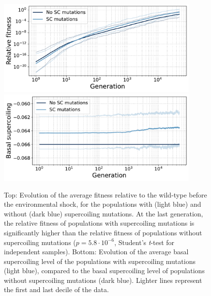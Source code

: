 \begin{figure}
\centering
\includegraphics[width=0.9\textwidth]{epistasis/img/relative_fitness_grouped.pdf}
\includegraphics[width=0.9\textwidth]{epistasis/img/with-sc/basal_sc_all.pdf}
\caption[Average fitness relative to the ancestor and basal supercoiling, during evolution after an environmental shock]{Top: Evolution of the average fitness relative to the wild-type before the environmental shock, for the populations with (light blue) and without (dark blue) supercoiling mutations.
At the last generation, the relative fitness of populations with supercoiling mutations is significantly higher than the relative fitness of populations without supercoiling mutations ($p = 5.8\cdot10^{-6}$, Student's \emph{t}-test for independent samples).
Bottom: Evolution of the average basal supercoiling level of the populations with supercoiling mutations (light blue), compared to the basal supercoiling level of populations without supercoiling mutations (dark blue).
Lighter lines represent the first and last decile of the data.}
\label{fig:epistasis:rel-fitness}
\end{figure}

